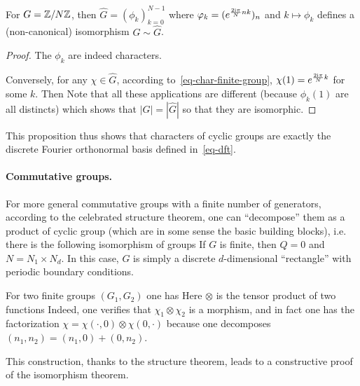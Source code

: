 \begin{prop}\label{prop-iso-cyclic}
	For $G=\mathbb{Z}/N\mathbb{Z}$, then $\hat G=( \phi_k )_{k=0}^{N-1}$ where $\varphi_k=( e^{\frac{2\mathrm{i}\pi}{N} nk} )_n$ and $k \mapsto \phi_k$ defines a (non-canonical) isomorphism $G \sim \hat G$. 
\end{prop}
\begin{proof}
	The $\phi_k$ are indeed characters.
	
	Conversely, for any $\chi \in \hat G$, according to~\eqref{eq-char-finite-group}, $\chi(1)=e^{\frac{2\mathrm{i}\pi}{N} k}$ for some $k$. Then 
	Note that all these applications are different (because $\phi_k(1)$ are all distincts) which shows that $|G|=|\hat G|$ so that they are isomorphic. 
\end{proof}

This proposition thus shows that characters of cyclic groups are exactly the discrete Fourier orthonormal basis defined in~\eqref{eq-dft}. 


\paragraph{Commutative groups.}

For more general commutative groups with a finite number of generators, according to the celebrated structure theorem, one can ``decompose'' them as a product of cyclic group (which are in some sense the basic building blocks), i.e. there is the following isomorphism of groups
If $G$ is finite, then $Q=0$ and $N=N_1 \times N_d$. In this case, $G$ is simply a discrete $d$-dimensional ``rectangle'' with periodic boundary conditions. 

For two finite groups $(G_1,G_2)$ one has 
Here $\otimes$ is the tensor product of two functions
Indeed, one verifies that $\chi_1 \otimes \chi_2$ is a morphism, and in fact one has the factorization $\chi=\chi(\cdot,0) \otimes \chi(0,\cdot)$ because one decomposes $(n_1,n_2)=(n_1,0)+(0,n_2)$. 

This construction, thanks to the structure theorem, leads to a constructive proof of the isomorphism theorem.


